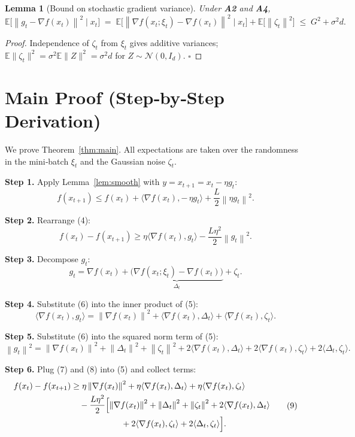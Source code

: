 \documentclass{article}
\newtheorem{lemma}{Lemma}
\newcommand{\E}{\mathbb{E}}
\newcommand{\norm}[1]{\left\|#1\right\|}
\newcommand{\grad}{\nabla}
\begin{document}
\begin{lemma}[Bound on stochastic gradient variance]\label{lem:var}
Under \textbf{A2} and \textbf{A4},
\[
\E\!\bigl[\norm{g_t-\grad f(x_t)}^{2}\mid x_t\bigr]
\;=\;
\E\!\bigl[\norm{\grad f(x_t;\xi_t)-\grad f(x_t)}^{2}\mid x_t\bigr]
+\E\!\bigl[\norm{\zeta_t}^{2}\bigr]
\;\le\; G^{2}+ \sigma^{2}d .
\tag{3}
\]
\end{lemma}
\begin{proof}
Independence of $\zeta_t$ from $\xi_t$ gives additive variances; $\E\|\zeta_t\|^{2}= \sigma^{2}\E\|Z\|^{2}= \sigma^{2}d$ for $Z\sim\mathcal{N}(0,I_d)$. \hfill $\square$
\end{proof}

\section*{Main Proof (Step‑by‑Step Derivation)}
We prove Theorem~\ref{thm:main}.  All expectations are taken over the randomness
in the mini‑batch $\xi_t$ and the Gaussian noise $\zeta_t$.

\noindent\textbf{Step 1.}  Apply Lemma~\ref{lem:smooth} with $y=x_{t+1}=x_t-\eta g_t$:
\[
f(x_{t+1})\le f(x_t)+\langle\grad f(x_t),-\,\eta g_t\rangle
+\frac{L}{2}\norm{\eta g_t}^{2}.
\tag{4}
\]

\noindent\textbf{Step 2.}  Rearrange (4):
\[
f(x_t)-f(x_{t+1})
\ge \eta\langle\grad f(x_t),g_t\rangle-\frac{L\eta^{2}}{2}\norm{g_t}^{2}.
\tag{5}
\]

\noindent\textbf{Step 3.}  Decompose $g_t$:
\[
g_t = \grad f(x_t) + \underbrace{\bigl(\grad f(x_t;\xi_t)-\grad f(x_t)\bigr)}_{\Delta_t}
       + \zeta_t .
\tag{6}
\]

\noindent\textbf{Step 4.}  Substitute (6) into the inner product of (5):
\[
\langle\grad f(x_t),g_t\rangle
= \norm{\grad f(x_t)}^{2}
  +\langle\grad f(x_t),\Delta_t\rangle
  +\langle\grad f(x_t),\zeta_t\rangle .
\tag{7}
\]

\noindent\textbf{Step 5.}  Substitute (6) into the squared norm term of (5):
\[
\norm{g_t}^{2}
= \norm{\grad f(x_t)}^{2}
  +\norm{\Delta_t}^{2}
  +\norm{\zeta_t}^{2}
  +2\langle\grad f(x_t),\Delta_t\rangle
  +2\langle\grad f(x_t),\zeta_t\rangle
  +2\langle\Delta_t,\zeta_t\rangle .
\tag{8}
\]

\noindent\textbf{Step 6.}  Plug (7) and (8) into (5) and collect terms:
\[
\begin{aligned}
f(x_t)-f(x_{t+1})
&\ge \eta\norm{\grad f(x_t)}^{2}
   +\eta\langle\grad f(x_t),\Delta_t\rangle
   +\eta\langle\grad f(x_t),\zeta_t\rangle \\
&\quad -\frac{L\eta^{2}}{2}\Bigl[
        \norm{\grad f(x_t)}^{2}
        +\norm{\Delta_t}^{2}
        +\norm{\zeta_t}^{2}
        +2\langle\grad f(x_t),\Delta_t\rangle \\
&\qquad\qquad\qquad
        +2\langle\grad f(x_t),\zeta_t\rangle
        +2\langle\Delta_t,\zeta_t\rangle
      \Bigr].
\end{aligned}
\tag{9}
\]
\end{document}
